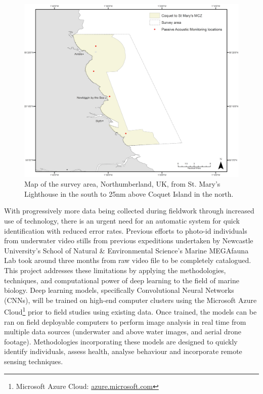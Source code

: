 \begin{figure}[H]
	\begin{center}
		\includegraphics[width=\linewidth]{Chapter1/figs/map.png}
	\end{center}
	\caption{Map of the survey area, Northumberland, UK, from St. Mary's Lighthouse in the south to 25nm above Coquet Island in the north.}
	\label{fig:map}
\end{figure}

With progressively more data being collected during fieldwork through increased use of technology, there is an urgent need for an automatic system for quick identification with reduced error rates. Previous efforts to photo-id individuals from underwater video stills from previous expeditions undertaken by Newcastle University's School of Natural \& Environmental Science's Marine MEGAfauna Lab took around three months from raw video file to be completely catalogued. This project addresses these limitations by applying the methodologies, techniques, and computational power of deep learning to the field of marine biology. Deep learning models, specifically Convolutional Neural Networks (CNNs), will be trained on high-end computer clusters using the Microsoft Azure Cloud\footnote{Microsoft Azure Cloud: \href{http://azure.microsoft.com}{azure.microsoft.com}} prior to field studies using existing data. Once trained, the models can be ran on field deployable computers to perform image analysis in real time from multiple data sources (underwater and above water images, and aerial drone footage). Methodologies incorporating these models are designed to quickly identify individuals, assess health, analyse behaviour and incorporate remote sensing techniques. 

